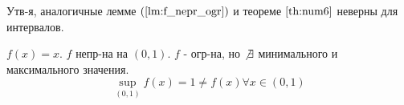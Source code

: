 \begin{note}
Утв-я, аналогичные лемме $(\ref{lm:f_nepr_ogr})$ и теореме $\ref{th:num6}$ неверны для интервалов.
\end{note}
\begin{example}
$f(x) = x$. $f$ непр-на на $(0, 1)$. $f$ - огр-на, но $\not\exists$ минимального и максимального значения.
\[
\underset{(0, 1)}{\sup}f(x) = 1 \neq f(x) \forall x \in (0, 1)
\]
\end{example}
